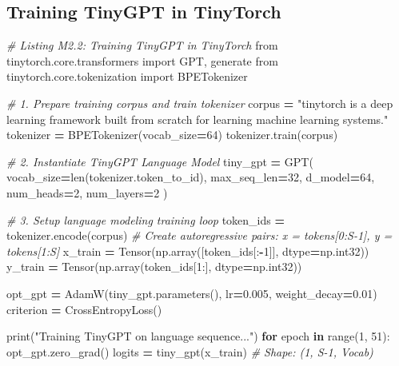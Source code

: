 \documentclass[
  letterpaper,
]{scrbook}
\newenvironment{Shaded}{\begin{snugshade}}{\end{snugshade}}
\newcommand{\BuiltInTok}[1]{#1}
\newcommand{\CommentTok}[1]{\textcolor[rgb]{0.56,0.35,0.01}{\textit{#1}}}
\newcommand{\ControlFlowTok}[1]{\textcolor[rgb]{0.13,0.29,0.53}{\textbf{#1}}}
\newcommand{\DecValTok}[1]{\textcolor[rgb]{0.00,0.00,0.81}{#1}}
\newcommand{\FloatTok}[1]{\textcolor[rgb]{0.00,0.00,0.81}{#1}}
\newcommand{\ImportTok}[1]{#1}
\newcommand{\KeywordTok}[1]{\textcolor[rgb]{0.13,0.29,0.53}{\textbf{#1}}}
\newcommand{\NormalTok}[1]{#1}
\newcommand{\OperatorTok}[1]{\textcolor[rgb]{0.81,0.36,0.00}{\textbf{#1}}}
\newcommand{\StringTok}[1]{\textcolor[rgb]{0.31,0.60,0.02}{#1}}
\begin{document}
\subsection*{Training TinyGPT in
TinyTorch}\label{training-tinygpt-in-tinytorch}

\begin{Shaded}
\begin{Highlighting}[]
\CommentTok{\# Listing M2.2: Training TinyGPT in TinyTorch}
\ImportTok{from}\NormalTok{ tinytorch.core.transformers }\ImportTok{import}\NormalTok{ GPT, generate}
\ImportTok{from}\NormalTok{ tinytorch.core.tokenization }\ImportTok{import}\NormalTok{ BPETokenizer}

\CommentTok{\# 1. Prepare training corpus and train tokenizer}
\NormalTok{corpus }\OperatorTok{=} \StringTok{"tinytorch is a deep learning framework built from scratch for learning machine learning systems."}
\NormalTok{tokenizer }\OperatorTok{=}\NormalTok{ BPETokenizer(vocab\_size}\OperatorTok{=}\DecValTok{64}\NormalTok{)}
\NormalTok{tokenizer.train(corpus)}

\CommentTok{\# 2. Instantiate TinyGPT Language Model}
\NormalTok{tiny\_gpt }\OperatorTok{=}\NormalTok{ GPT(}
\NormalTok{    vocab\_size}\OperatorTok{=}\BuiltInTok{len}\NormalTok{(tokenizer.token\_to\_id),}
\NormalTok{    max\_seq\_len}\OperatorTok{=}\DecValTok{32}\NormalTok{,}
\NormalTok{    d\_model}\OperatorTok{=}\DecValTok{64}\NormalTok{,}
\NormalTok{    num\_heads}\OperatorTok{=}\DecValTok{2}\NormalTok{,}
\NormalTok{    num\_layers}\OperatorTok{=}\DecValTok{2}
\NormalTok{)}

\CommentTok{\# 3. Setup language modeling training loop}
\NormalTok{token\_ids }\OperatorTok{=}\NormalTok{ tokenizer.encode(corpus)}
\CommentTok{\# Create autoregressive pairs: x = tokens[0:S{-}1], y = tokens[1:S]}
\NormalTok{x\_train }\OperatorTok{=}\NormalTok{ Tensor(np.array([token\_ids[:}\OperatorTok{{-}}\DecValTok{1}\NormalTok{]], dtype}\OperatorTok{=}\NormalTok{np.int32))}
\NormalTok{y\_train }\OperatorTok{=}\NormalTok{ Tensor(np.array(token\_ids[}\DecValTok{1}\NormalTok{:], dtype}\OperatorTok{=}\NormalTok{np.int32))}

\NormalTok{opt\_gpt }\OperatorTok{=}\NormalTok{ AdamW(tiny\_gpt.parameters(), lr}\OperatorTok{=}\FloatTok{0.005}\NormalTok{, weight\_decay}\OperatorTok{=}\FloatTok{0.01}\NormalTok{)}
\NormalTok{criterion }\OperatorTok{=}\NormalTok{ CrossEntropyLoss()}

\BuiltInTok{print}\NormalTok{(}\StringTok{"Training TinyGPT on language sequence..."}\NormalTok{)}
\ControlFlowTok{for}\NormalTok{ epoch }\KeywordTok{in} \BuiltInTok{range}\NormalTok{(}\DecValTok{1}\NormalTok{, }\DecValTok{51}\NormalTok{):}
\NormalTok{    opt\_gpt.zero\_grad()}
\NormalTok{    logits }\OperatorTok{=}\NormalTok{ tiny\_gpt(x\_train)  }\CommentTok{\# Shape: (1, S{-}1, Vocab)}


\end{Highlighting}
\end{Shaded}
\end{document}
